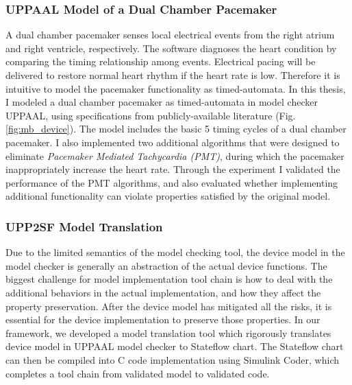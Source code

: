 \documentclass[a4paper,11pt]{article}
\begin{document}
\subsubsection{UPPAAL Model of a Dual Chamber Pacemaker}
A dual chamber pacemaker senses local electrical events from the right atrium and right ventricle, respectively.
The software diagnoses the heart condition by comparing the timing relationship among events.
Electrical pacing will be delivered to restore normal heart rhythm if the heart rate is low.
Therefore it is intuitive to model the pacemaker functionality as timed-automata.
In this thesis, I modeled a dual chamber pacemaker as timed-automata in model checker UPPAAL, using specifications from publicly-available literature (Fig. \ref{fig:mb_device}).
The model includes the basic 5 timing cycles of a dual chamber pacemaker.
I also implemented two additional algorithms that were designed to eliminate \emph{Pacemaker Mediated Tachycardia (PMT)}, during which the pacemaker inappropriately increase the heart rate.
Through the experiment I validated the performance of the PMT algorithms, and also evaluated whether implementing additional functionality can violate properties satisfied by the original model.
\subsubsection{UPP2SF Model Translation}
Due to the limited semantics of the model checking tool, the device model in the model checker is generally an abstraction of the actual device functions.
The biggest challenge for model implementation tool chain is how to deal with the additional behaviors in the actual implementation, and how they affect the property preservation.
After the device model has mitigated all the risks, it is essential for the device implementation to preserve those properties.
In our framework, we developed a model translation tool which rigorously translates device model in UPPAAL model checker to Stateflow chart.
The Stateflow chart can then be compiled into C code implementation using Simulink Coder, which completes a tool chain from validated model to validated code.
\end{document}
